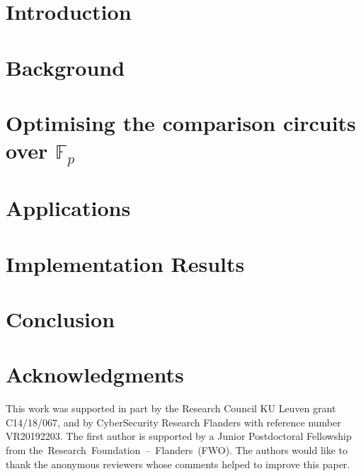 \documentclass[USenglish,oneside,twocolumn]{article}
\theoremstyle{remark}
\begin{document}
\section{Introduction}
\label{sec:introduction}


\section{Background}
\label{sec:background}


% 

\section{Optimising the comparison circuits over $\mathbb{F}_p$}
\label{sec:comparison-circuit}



\section{Applications}
\label{sec:applications}


\section{Implementation Results}
\label{sec:impl-results}


% 

\section{Conclusion}


\section*{Acknowledgments}
This work was supported in part by the Research Council KU Leuven grant C14/18/067, and by CyberSecurity Research Flanders with reference number VR20192203. The first author is supported by a Junior Postdoctoral Fellowship from \mbox{the Research Foundation -- Flanders (FWO)}.
The authors would like to thank the anonymous reviewers whose comments helped to improve this paper.  




\appendix

\end{document}
